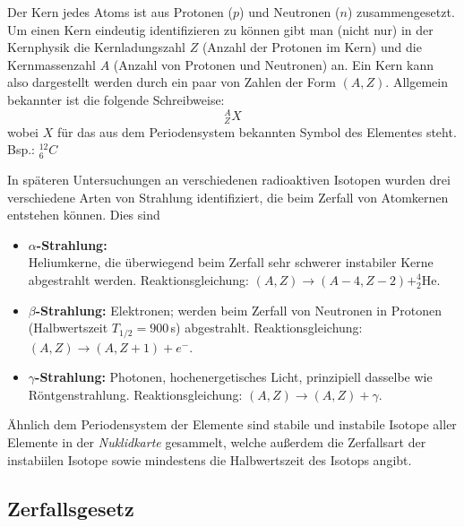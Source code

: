 \noindent
Der Kern jedes Atoms ist aus Protonen ($p$) und Neutronen ($n$) zusammengesetzt. Um einen Kern eindeutig identifizieren zu können gibt man (nicht nur) in der Kernphysik die Kernladungszahl $Z$ (Anzahl der Protonen im Kern) und die Kernmassenzahl $A$ (Anzahl von Protonen und Neutronen) an. Ein Kern kann also dargestellt werden durch ein paar von Zahlen der Form $(A,Z)$. Allgemein bekannter ist die folgende Schreibweise:
\begin{equation*}
^A_Z X
\end{equation*}
wobei $X$ für das aus dem Periodensystem bekannten Symbol des Elementes steht. Bsp.: $^{12}_6 C$

\noindent
In späteren Untersuchungen an verschiedenen radioaktiven Isotopen wurden drei verschiedene Arten von Strahlung identifiziert, die beim Zerfall von Atomkernen entstehen können. Dies sind 
\begin{itemize}
	\item \textbf{$\alpha$-Strahlung:} \\
		Heliumkerne, die überwiegend beim Zerfall sehr schwerer instabiler Kerne abgestrahlt werden. Reaktionsgleichung: $(A,Z) \rightarrow (A-4, Z-2) + ^4_2\mathrm{He}$.
	\item \textbf{$\beta$-Strahlung:} Elektronen; werden beim Zerfall von Neutronen in Protonen (Halbwertszeit $T_{1/2} = 900$\,s) abgestrahlt. Reaktionsgleichung: $(A,Z) \rightarrow (A, Z+1) + e^-$.
	\item \textbf{$\gamma$-Strahlung:} Photonen, hochenergetisches Licht, prinzipiell dasselbe wie Röntgenstrahlung. Reaktionsgleichung: $(A,Z) \rightarrow (A,Z) + \gamma$.
\end{itemize}
Ähnlich dem Periodensystem der Elemente sind stabile und instabile Isotope aller Elemente in der \textit{Nuklidkarte} gesammelt, welche außerdem die Zerfallsart der instabiilen Isotope sowie mindestens die Halbwertszeit des Isotops angibt.\\

\subsection{Zerfallsgesetz}

